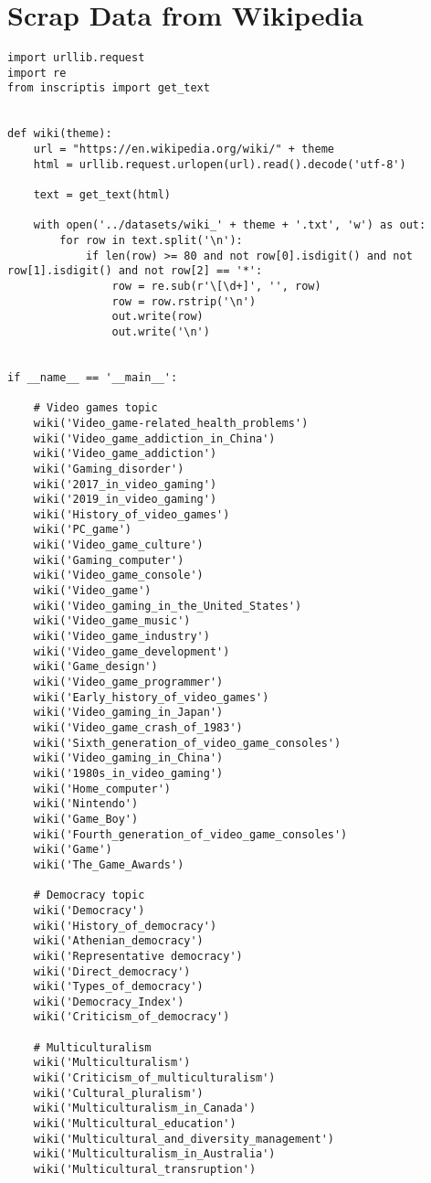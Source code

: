 
\chapter{Scrap Data from Wikipedia}

\label{Appendix1}

\begin{lstlisting}[language=iPython]
import urllib.request
import re
from inscriptis import get_text


def wiki(theme):
	url = "https://en.wikipedia.org/wiki/" + theme
	html = urllib.request.urlopen(url).read().decode('utf-8')
	
	text = get_text(html)
	
	with open('../datasets/wiki_' + theme + '.txt', 'w') as out:
		for row in text.split('\n'):
			if len(row) >= 80 and not row[0].isdigit() and not row[1].isdigit() and not row[2] == '*':
				row = re.sub(r'\[\d+]', '', row)
				row = row.rstrip('\n')
				out.write(row)
				out.write('\n')


if __name__ == '__main__':
	
	# Video games topic
	wiki('Video_game-related_health_problems')
	wiki('Video_game_addiction_in_China')
	wiki('Video_game_addiction')
	wiki('Gaming_disorder')
	wiki('2017_in_video_gaming')
	wiki('2019_in_video_gaming')
	wiki('History_of_video_games')
	wiki('PC_game')
	wiki('Video_game_culture')
	wiki('Gaming_computer')
	wiki('Video_game_console')
	wiki('Video_game')
	wiki('Video_gaming_in_the_United_States')
	wiki('Video_game_music')
	wiki('Video_game_industry')
	wiki('Video_game_development')
	wiki('Game_design')
	wiki('Video_game_programmer')
	wiki('Early_history_of_video_games')
	wiki('Video_gaming_in_Japan')
	wiki('Video_game_crash_of_1983')
	wiki('Sixth_generation_of_video_game_consoles')
	wiki('Video_gaming_in_China')
	wiki('1980s_in_video_gaming')
	wiki('Home_computer')
	wiki('Nintendo')
	wiki('Game_Boy')
	wiki('Fourth_generation_of_video_game_consoles')
	wiki('Game')
	wiki('The_Game_Awards')
	
	# Democracy topic
	wiki('Democracy')
	wiki('History_of_democracy')
	wiki('Athenian_democracy')
	wiki('Representative democracy')
	wiki('Direct_democracy')
	wiki('Types_of_democracy')
	wiki('Democracy_Index')
	wiki('Criticism_of_democracy')
	
	# Multiculturalism
	wiki('Multiculturalism')
	wiki('Criticism_of_multiculturalism')
	wiki('Cultural_pluralism')
	wiki('Multiculturalism_in_Canada')
	wiki('Multicultural_education')
	wiki('Multicultural_and_diversity_management')
	wiki('Multiculturalism_in_Australia')
	wiki('Multicultural_transruption')
	
\end{lstlisting}
